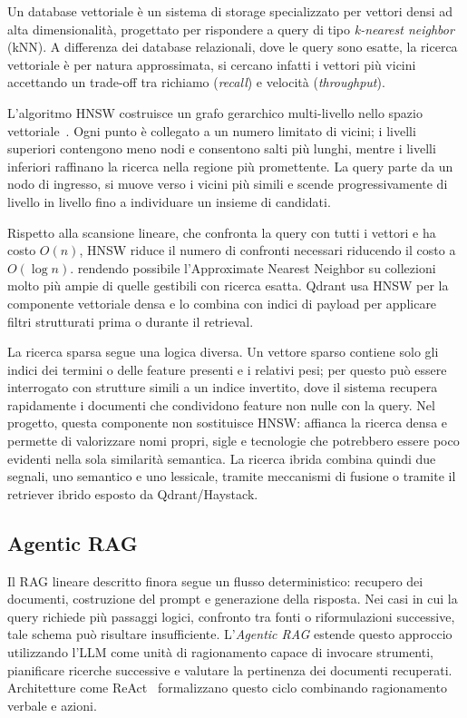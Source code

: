 Un database vettoriale è un sistema di storage specializzato per vettori densi
ad alta dimensionalità, progettato per rispondere a query di tipo
\textit{k-nearest neighbor} (kNN). A differenza dei database relazionali,
dove le query sono esatte, la ricerca vettoriale è per natura approssimata,
si cercano infatti i vettori più vicini accettando un trade-off tra richiamo
(\textit{recall}) e velocità (\textit{throughput}).

L'algoritmo HNSW costruisce un grafo gerarchico multi-livello nello spazio
vettoriale~\cite{malkov2018efficient}. Ogni punto è collegato a un numero
limitato di vicini; i livelli superiori contengono meno nodi e consentono salti
più lunghi, mentre i livelli inferiori raffinano la ricerca nella regione più
promettente. La query parte da un nodo di ingresso, si muove verso i vicini più
simili e scende progressivamente di livello in livello fino a individuare un insieme di
candidati.

Rispetto alla scansione lineare, che confronta la query con tutti i vettori e
ha costo $O(n)$, HNSW riduce il numero di confronti necessari riducendo il costo a $O(\log n)$. 
rendendo possibile l'Approximate Nearest Neighbor su collezioni
molto più ampie di quelle gestibili con ricerca esatta. Qdrant usa HNSW per la
componente vettoriale densa e lo combina con indici di payload per applicare
filtri strutturati prima o durante il retrieval.

La ricerca sparsa segue una logica diversa. Un vettore sparso contiene solo gli
indici dei termini o delle feature presenti e i relativi pesi; per questo può
essere interrogato con strutture simili a un indice invertito, dove il sistema
recupera rapidamente i documenti che condividono feature non nulle con la
query. Nel progetto, questa componente non sostituisce HNSW: affianca la
ricerca densa e permette di valorizzare nomi propri, sigle e tecnologie che
potrebbero essere poco evidenti nella sola similarità semantica. La ricerca
ibrida combina quindi due segnali, uno semantico e uno lessicale, tramite
meccanismi di fusione o tramite il retriever ibrido esposto da Qdrant/Haystack.


\subsection{Agentic RAG}
\label{subsec:agentic_rag}

Il RAG lineare descritto finora segue un flusso deterministico: recupero dei
documenti, costruzione del prompt e generazione della risposta. Nei casi in cui
la query richiede più passaggi logici, confronto tra fonti o riformulazioni
successive, tale schema può risultare insufficiente. L'\textit{Agentic RAG}
estende questo approccio utilizzando l'LLM come unità di ragionamento capace di
invocare strumenti, pianificare ricerche successive e valutare la pertinenza dei
documenti recuperati. Architetture come ReAct~\cite{yao2023react} formalizzano
questo ciclo combinando ragionamento verbale e azioni.

